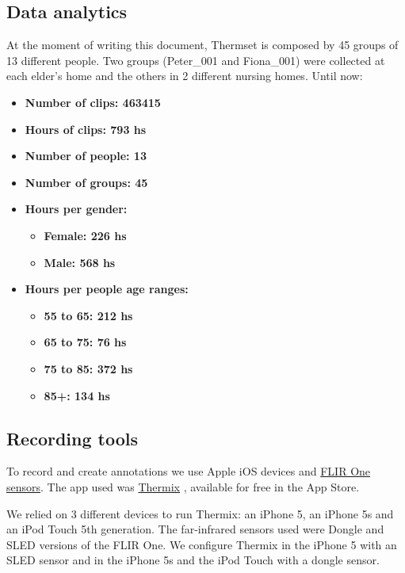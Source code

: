 \documentclass[oneside, twocolumn]{article}
\newcommand\NumberOfGroups{45}
\newcommand\TotalHoursOfRecording{793}
\newcommand\NumberOfPeople{13}
\newcommand\NumberOfClips{463415}
\begin{document}
\subsection{Data analytics}
At the moment of writing this document, Thermset is composed by \NumberOfGroups{} groups of \NumberOfPeople{} different people.
Two groups (Peter\_001 and Fiona\_001) were collected at each elder's home and the others in 2 different
nursing homes. Until now:

\begin{itemize}
	\item \textbf{Number of clips: \NumberOfClips{}}
  \item \textbf{Hours of clips: \TotalHoursOfRecording{} hs}
  \item \textbf{Number of people: \NumberOfPeople{}}
  \item \textbf{Number of groups: \NumberOfGroups{}}
  \item \textbf{Hours per gender:}
  \begin{itemize}
    \item \textbf{Female: 226 hs}
    \item \textbf{Male: 568 hs}
  \end{itemize}
  \item \textbf{Hours per people age ranges:}
  \begin{itemize}
    \item \textbf{55 to 65: 212 hs}
    \item \textbf{65 to 75: 76 hs}
    \item \textbf{75 to 85: 372 hs}
    \item \textbf{85+: 134 hs}
  \end{itemize}
\end{itemize}

\subsection{Recording tools}
To record and create annotations we use Apple iOS devices and \href{http://www.flir.com/flirone/ios/}{FLIR One sensors}.
The app used was \href{http://appstore.com/thermixforflirone}{Thermix}\cite{thermix} ,
available for free in the App Store.

We relied on 3 different devices to run Thermix: an iPhone 5, an iPhone 5s and an iPod Touch 5th generation.
The far-infrared sensors used were Dongle and SLED versions of the FLIR One.
We configure Thermix in the iPhone 5 with an SLED sensor and in the iPhone 5s and the
iPod Touch with a dongle sensor\cite{sdk_flir_dongle}\cite{sdk_flir_sled}.
\end{document}
